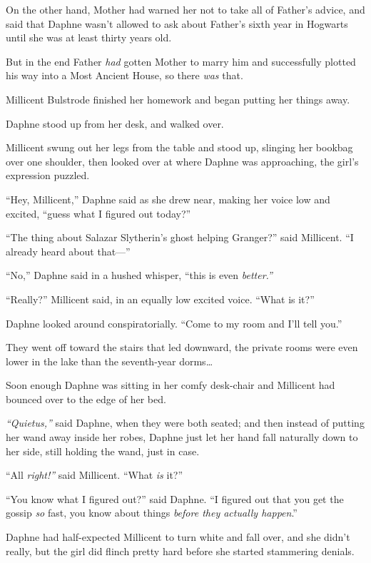 On the other hand, Mother had warned her not to take all of Father's
advice, and said that Daphne wasn't allowed to ask about Father's sixth
year in Hogwarts until she was at least thirty years old.

But in the end Father \emph{had} gotten Mother to marry him and
successfully plotted his way into a Most Ancient House, so there
\emph{was} that.

Millicent Bulstrode finished her homework and began putting her things
away.

Daphne stood up from her desk, and walked over.

Millicent swung out her legs from the table and stood up, slinging her
bookbag over one shoulder, then looked over at where Daphne was
approaching, the girl's expression puzzled.

``Hey, Millicent,'' Daphne said as she drew near, making her voice low
and excited, ``guess what I figured out today?''

``The thing about Salazar Slytherin's ghost helping Granger?'' said
Millicent. ``I already heard about that---''

``No,'' Daphne said in a hushed whisper, ``this is even \emph{better.''}

``Really?'' Millicent said, in an equally low excited voice. ``What is
it?''

Daphne looked around conspiratorially. ``Come to my room and I'll tell
you.''

They went off toward the stairs that led downward, the private rooms
were even lower in the lake than the seventh-year dorms\ldots{}

Soon enough Daphne was sitting in her comfy desk-chair and Millicent had
bounced over to the edge of her bed.

\emph{``Quietus,''} said Daphne, when they were both seated; and then
instead of putting her wand away inside her robes, Daphne just let her
hand fall naturally down to her side, still holding the wand, just in
case.

``All \emph{right!''} said Millicent. ``What \emph{is} it?''

``You know what I figured out?'' said Daphne. ``I figured out that you
get the gossip \emph{so} fast, you know about things \emph{before they
actually happen}.''

Daphne had half-expected Millicent to turn white and fall over, and she
didn't really, but the girl did flinch pretty hard before she started
stammering denials.

